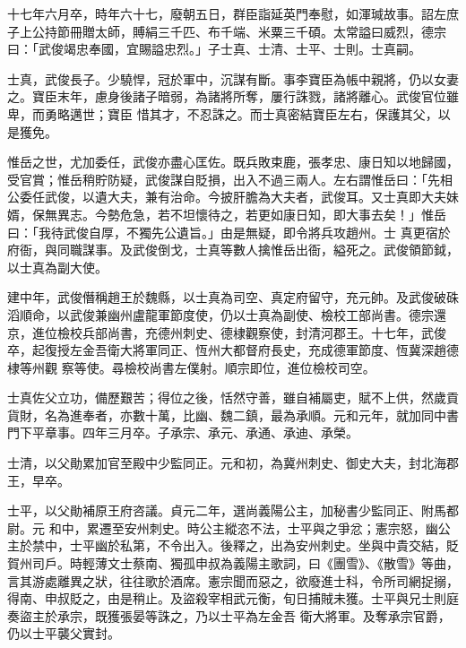 \begin{pinyinscope}
 十七年六月卒，時年六十七，廢朝五日，群臣詣延英門奉慰，如渾瑊故事。詔左庶子上公持節冊贈太師，賻絹三千匹、布千端、米粟三千碩。太常謚曰威烈，德宗曰：「武俊竭忠奉國，宜賜謚忠烈。」子士真、士清、士平、士則。士真嗣。



 士真，武俊長子。少驍悍，冠於軍中，沉謀有斷。事李寶臣為帳中親將，仍以女妻之。寶臣末年，慮身後諸子暗弱，為諸將所奪，屢行誅戮，諸將離心。武俊官位雖卑，而勇略邁世；寶臣
 惜其才，不忍誅之。而士真密結寶臣左右，保護其父，以是獲免。



 惟岳之世，尤加委任，武俊亦盡心匡佐。既兵敗束鹿，張孝忠、康日知以地歸國，受官賞；惟岳稍貯防疑，武俊謀自貶損，出入不過三兩人。左右謂惟岳曰：「先相公委任武俊，以遺大夫，兼有治命。今披肝膽為大夫者，武俊耳。又士真即大夫妹婿，保無異志。今勢危急，若不坦懷待之，若更如康日知，即大事去矣！」惟岳曰：「我待武俊自厚，不獨先公遺旨。」由是無疑，即令將兵攻趙州。士
 真更宿於府衙，與同職謀事。及武俊倒戈，士真等數人擒惟岳出衙，縊死之。武俊領節鉞，以士真為副大使。



 建中年，武俊僭稱趙王於魏縣，以士真為司空、真定府留守，充元帥。及武俊破硃滔順命，以武俊兼幽州盧龍軍節度使，仍以士真為副使、檢校工部尚書。德宗還京，進位檢校兵部尚書，充德州刺史、德棣觀察使，封清河郡王。十七年，武俊卒，起復授左金吾衛大將軍同正、恆州大都督府長史，充成德軍節度、恆冀深趙德棣等州觀
 察等使。尋檢校尚書左僕射。順宗即位，進位檢校司空。



 士真佐父立功，備歷艱苦；得位之後，恬然守善，雖自補屬吏，賦不上供，然歲貢貨財，名為進奉者，亦數十萬，比幽、魏二鎮，最為承順。元和元年，就加同中書門下平章事。四年三月卒。子承宗、承元、承通、承迪、承榮。



 士清，以父勛累加官至殿中少監同正。元和初，為冀州刺史、御史大夫，封北海郡王，早卒。



 士平，以父勛補原王府咨議。貞元二年，選尚義陽公主，加秘書少監同正、附馬都尉。元
 和中，累遷至安州刺史。時公主縱恣不法，士平與之爭忿；憲宗怒，幽公主於禁中，士平幽於私第，不令出入。後釋之，出為安州刺史。坐與中貴交結，貶賀州司戶。時輕薄文士蔡南、獨孤申叔為義陽主歌詞，曰《團雪》、《散雪》等曲，言其游處離異之狀，往往歌於酒席。憲宗聞而惡之，欲廢進士科，令所司網捉搦，得南、申叔貶之，由是稍止。及盜殺宰相武元衡，旬日捕賊未獲。士平與兄士則庭奏盜主於承宗，既獲張晏等誅之，乃以士平為左金吾
 衛大將軍。及奪承宗官爵，仍以士平襲父實封。




\end{pinyinscope}
